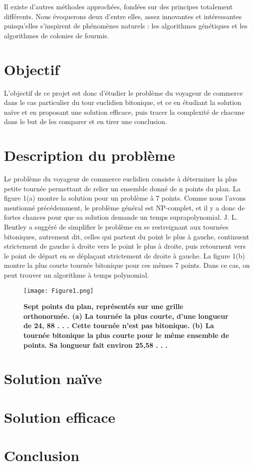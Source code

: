 \documentclass[12pt, openany]{report}
\begin{document}
Il existe d’autres méthodes approchées, fondées sur des principes totalement différents. Nous évoquerons deux d’entre elles, assez innovantes et intéressantes puisqu’elles s’inspirent de phénomènes naturels : les algorithmes génétiques et les algorithmes de colonies de fourmis.
\setlength{\parindent}{1cm}\section{Objectif}
L'objectif de ce projet est donc d'étudier le problème du voyageur de commerce dans le cas particulier du tour euclidien bitonique, et ce en étudiant la solution naïve et en proposant une solution efficace, puis tracer la complexité de chacune dans le but de les comparer et en tirer une conclusion.
\setlength{\parindent}{1cm}\section{Description du problème}
Le problème du voyageur de commerce euclidien consiste à déterminer la plus petite
tournée permettant de relier un ensemble donné de n points du plan. La figure 1(a)
montre la solution pour un problème à 7 points. Comme nous l'avons mentionné précédemment, le problème général est NP-complet, et il y a donc de fortes chances pour que sa solution demande un temps suprapolynomial. 
J. L. Bentley a suggéré de simplifier le problème en se restreignant aux tournées
bitoniques, autrement dit, celles qui partent du point le plus à gauche, continuent
strictement de gauche à droite vers le point le plus à droite, puis retournent vers
le point de départ en se déplaçant strictement de droite à gauche. La figure 1(b)
montre la plus courte tournée bitonique pour ces mêmes 7 points. Dans ce cas, on
peut trouver un algorithme à temps polynomial.
\begin{center}
	\begin{figure}[h]
		\begin{center}
			\texttt{[image: Figure1.png]} 
		\end{center}
		\caption{\textbf{Sept points du plan, représentés sur une grille orthonormée. (a) La tournée la plus
				courte, d’une longueur de 24, 88 . . . Cette tournée n’est pas bitonique. (b) La tournée bitonique
				la plus courte pour le même ensemble de points. Sa longueur fait environ 25,58 . . .}}
		\label{Sept points du plan, représentés sur une grille orthonormée. (a) La tournée la plus
			courte, d’une longueur de 24, 88 . . . Cette tournée n’est pas bitonique. (b) La tournée bitonique
			la plus courte pour le même ensemble de points. Sa longueur fait environ 25,58 . . .}
	\end{figure} 
\end{center} 
\section{Solution naïve}
\section{Solution efficace}
\section{Conclusion}
\end{document}
